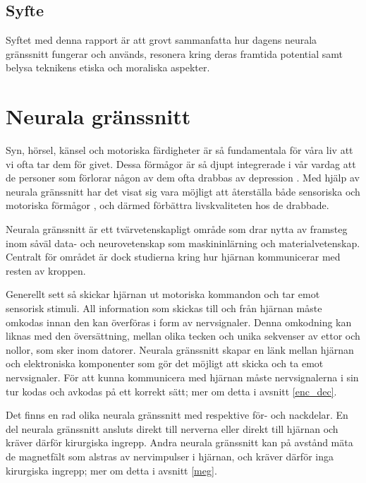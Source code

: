 \documentclass[12pt, a4paper]{article}
\begin{document}

\subsection{Syfte}

Syftet med denna rapport är att grovt sammanfatta hur dagens neurala gränssnitt fungerar och används, resonera kring deras framtida potential samt belysa teknikens etiska och moraliska aspekter.


\section{Neurala gränssnitt}

Syn, hörsel, känsel och motoriska färdigheter är så fundamentala för våra liv att vi ofta tar dem för givet. Dessa förmågor är så djupt integrerade i vår vardag att de personer som förlorar någon av dem ofta drabbas av depression \cite{depression}. Med hjälp av neurala gränssnitt har det visat sig vara möjligt att återställa både sensoriska \cite{sight1,sound,touch} och motoriska förmågor \cite{prosthetic_operation}, och därmed förbättra livskvaliteten hos de drabbade.

Neurala gränssnitt är ett tvärvetenskapligt område som drar nytta av framsteg inom såväl data- och neurovetenskap som maskininlärning och materialvetenskap. Centralt för området är dock studierna kring hur hjärnan kommunicerar med resten av kroppen.

Generellt sett så skickar hjärnan ut motoriska kommandon och tar emot sensorisk stimuli. All information som skickas till och från hjärnan måste omkodas innan den kan överföras i form av nervsignaler. Denna omkodning kan liknas med den översättning, mellan olika tecken och unika sekvenser av ettor och nollor, som sker inom datorer. Neurala gränssnitt skapar en länk mellan hjärnan och elektroniska komponenter som gör det möjligt att skicka och ta emot nervsignaler. För att kunna kommunicera med hjärnan måste nervsignalerna i sin tur kodas och avkodas på ett korrekt sätt; mer om detta i avsnitt \ref{enc_dec}.

Det finns en rad olika neurala gränssnitt med respektive för- och nackdelar. En del neurala gränssnitt ansluts direkt till nerverna eller direkt till hjärnan och kräver därför kirurgiska ingrepp. Andra neurala gränssnitt kan på avstånd mäta de magnetfält som alstras av nervimpulser i hjärnan, och kräver därför inga kirurgiska ingrepp; mer om detta i avsnitt \ref{meg}.
\end{document}
